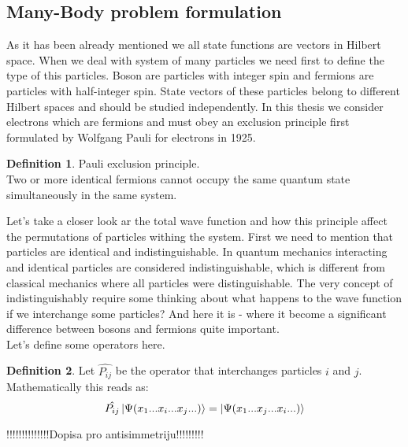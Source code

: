 \documentclass[twoside,english]{uiofysmaster}
\theoremstyle{definition}
\newtheorem{defn}{Definition}
\begin{document}
\subsection{Many-Body problem formulation}
As it has been already mentioned we all state functions are vectors in Hilbert space. When we deal with system of many particles we need first to define the type of this particles. Boson are particles with integer spin and fermions are particles with half-integer spin. State vectors of these particles belong to different Hilbert spaces and should be studied independently. In this thesis we consider electrons which are fermions and must obey an exclusion principle first formulated by Wolfgang Pauli for electrons in 1925.
\begin{defn}Pauli exclusion principle.\\
Two or more identical fermions cannot occupy the same quantum state simultaneously in the same system.
\end{defn}
Let's take a closer look ar the total wave function and how this principle affect the permutations of particles withing the system.
First we need to mention that particles are identical and indistinguishable. In quantum mechanics interacting and identical particles are considered indistinguishable, which is different from classical mechanics where all particles were distinguishable. The very concept of indistinguishably require some thinking about what happens to the wave function if we interchange some particles? And here it is - where it become a significant difference between bosons and fermions quite important. \\
Let's define some operators here.\\
\begin{defn}
Let $\hat{P_{ij}}$ be the operator that interchanges particles $i$ and $j$. Mathematically this reads as:
\[\hat{P_{ij}} \ket{ \Psi(x_1 ... x_i ... x_j ...) }=\ket{ \Psi(x_1 ... x_j ... x_i ...) } \]
\end{defn}
!!!!!!!!!!!!!!Dopisa pro antisimmetriju!!!!!!!!!
\end{document}
